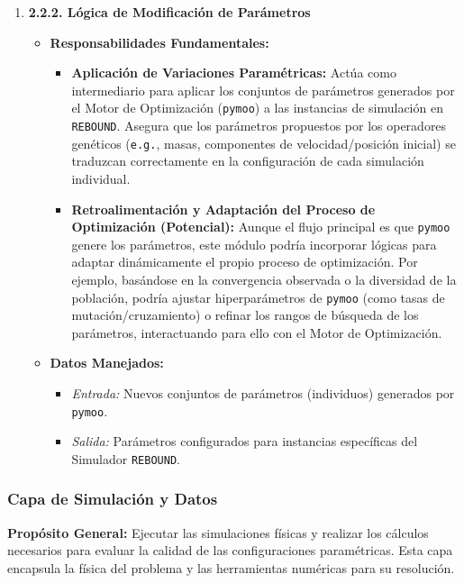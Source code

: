\begin{enumerate}
    \item \textbf{2.2.2. Lógica de Modificación de Parámetros}
    \begin{itemize}
        \item \textbf{Responsabilidades Fundamentales:}
        \begin{itemize}
            \item \textbf{Aplicación de Variaciones Paramétricas:} Actúa como intermediario para aplicar los conjuntos de parámetros generados por el Motor de Optimización (\texttt{pymoo}) a las instancias de simulación en \texttt{REBOUND}. Asegura que los parámetros propuestos por los operadores genéticos (\texttt{e.g.}, masas, componentes de velocidad/posición inicial) se traduzcan correctamente en la configuración de cada simulación individual.
            \item \textbf{Retroalimentación y Adaptación del Proceso de Optimización (Potencial):} Aunque el flujo principal es que \texttt{pymoo} genere los parámetros, este módulo podría incorporar lógicas para adaptar dinámicamente el propio proceso de optimización. Por ejemplo, basándose en la convergencia observada o la diversidad de la población, podría ajustar hiperparámetros de \texttt{pymoo} (como tasas de mutación/cruzamiento) o refinar los rangos de búsqueda de los parámetros, interactuando para ello con el Motor de Optimización.
        \end{itemize}
        \item \textbf{Datos Manejados:}
        \begin{itemize}
            \item \textit{Entrada:} Nuevos conjuntos de parámetros (individuos) generados por \texttt{pymoo}.
            \item \textit{Salida:} Parámetros configurados para instancias específicas del Simulador \texttt{REBOUND}.
        \end{itemize}
    \end{itemize}
\end{enumerate}

\subsubsection{Capa de Simulación y Datos}
\textbf{Propósito General:} Ejecutar las simulaciones físicas y realizar los cálculos necesarios para evaluar la calidad de las configuraciones paramétricas. Esta capa encapsula la física del problema y las herramientas numéricas para su resolución.

